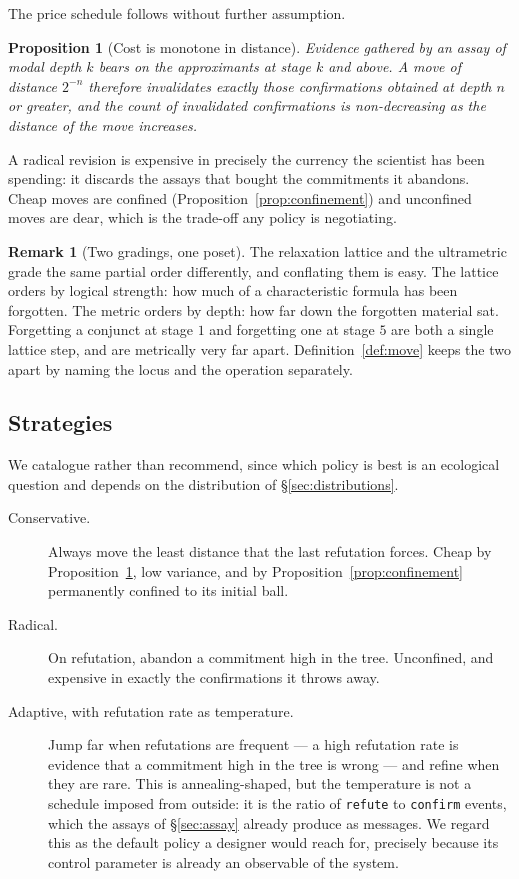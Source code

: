 \documentclass[11pt]{article}
\theoremstyle{plain}
\newtheorem{proposition}[theorem]{Proposition}
\theoremstyle{definition}
\newtheorem{remark}[theorem]{Remark}
\begin{document}
The price schedule follows without further assumption.

\begin{proposition}[Cost is monotone in distance]
\label{prop:movecost}
Evidence gathered by an assay of modal depth $k$ bears on the approximants at stage $k$ and above. A
move of distance $2^{-n}$ therefore invalidates exactly those confirmations obtained at depth $n$ or
greater, and the count of invalidated confirmations is non-decreasing as the distance of the move
increases.
\end{proposition}

A radical revision is expensive in precisely the currency the scientist has been spending: it discards
the assays that bought the commitments it abandons. Cheap moves are confined
(Proposition~\ref{prop:confinement}) and unconfined moves are dear, which is the trade-off any policy
is negotiating.

\begin{remark}[Two gradings, one poset]
\label{rem:twogradings}
The relaxation lattice and the ultrametric grade the same partial order differently, and conflating
them is easy. The lattice orders by logical strength: how much of a characteristic formula has been
forgotten. The metric orders by depth: how far down the forgotten material sat. Forgetting a conjunct
at stage $1$ and forgetting one at stage $5$ are both a single lattice step, and are metrically very
far apart. Definition~\ref{def:move} keeps the two apart by naming the locus and the operation
separately.
\end{remark}

\subsection{Strategies}

We catalogue rather than recommend, since which policy is best is an ecological question and depends on
the distribution of \S\ref{sec:distributions}.

\begin{description}
\item[Conservative.] Always move the least distance that the last refutation forces. Cheap by
Proposition~\ref{prop:movecost}, low variance, and by Proposition~\ref{prop:confinement} permanently
confined to its initial ball.

\item[Radical.] On refutation, abandon a commitment high in the tree. Unconfined, and expensive in
exactly the confirmations it throws away.

\item[Adaptive, with refutation rate as temperature.] Jump far when refutations are frequent --- a
high refutation rate is evidence that a commitment high in the tree is wrong --- and refine when they
are rare. This is annealing-shaped, but the temperature is not a schedule imposed from outside: it is
the ratio of \texttt{refute} to \texttt{confirm} events, which the assays of \S\ref{sec:assay} already
produce as messages. We regard this as the default policy a designer would reach for, precisely
because its control parameter is already an observable of the system.
\end{description}
\end{document}
